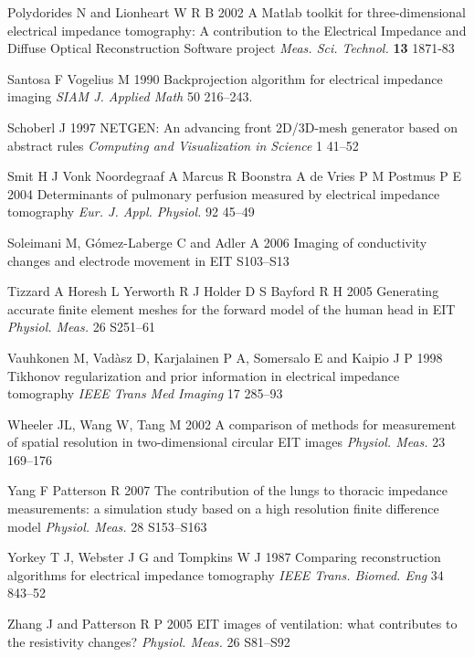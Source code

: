 \documentclass[12pt]{iopart}
\begin{document}
\item[]
Polydorides N and Lionheart W R B 2002 A Matlab toolkit for
three-dimensional electrical impedance tomography: A contribution
to the Electrical Impedance and Diffuse Optical Reconstruction
Software project {\em Meas. Sci. Technol.} {\bf 13} 1871-83

\item[]
Santosa F Vogelius M 1990
Backprojection algorithm for electrical impedance imaging
{\em SIAM J. Applied Math}
50 216--243. 

\item[]
Schoberl J 1997
NETGEN: An advancing front 2D/3D-mesh generator based on abstract rules
{\em Computing and Visualization in Science}
1 41--52 

\item[]
Smit H J
Vonk Noordegraaf A
Marcus R
Boonstra A
de Vries P M 
Postmus P E
2004
Determinants of pulmonary perfusion measured by electrical impedance tomography
{\em Eur. J. Appl. Physiol.}
92 45--49

\item[]
Soleimani M, G\'omez-Laberge C and Adler A 2006 Imaging of
conductivity changes and electrode movement in EIT 
S103--S13

\item[]
Tizzard A Horesh L Yerworth R J Holder D S Bayford R H 2005
Generating accurate finite element meshes for the forward
model of the human head in EIT
{\em Physiol. Meas.}
 26 S251--61 

\item[]
Vauhkonen M, Vad\`asz D, Karjalainen P A, Somersalo E and
Kaipio J P 1998
 Tikhonov regularization and prior information in
electrical impedance tomography
 {\em IEEE Trans Med Imaging}
17 285--93

\item[]
Wheeler JL, Wang W, Tang M 2002
A comparison of methods for measurement of spatial resolution in two-dimensional circular EIT images
{\em Physiol. Meas.}
23 169--176

\item[]
Yang F  Patterson R 2007
The contribution of the lungs to thoracic impedance
measurements: a simulation study based on a high
resolution finite difference model
{\em Physiol. Meas.}
28 S153--S163

\item[]
Yorkey T J, Webster J G and Tompkins W J 1987
Comparing reconstruction algorithms for electrical
impedance tomography
{\em IEEE Trans. Biomed. Eng}
34 843--52


\item[]
Zhang J and Patterson R P 2005 EIT images of ventilation: what
contributes to the resistivity changes?
{\em Physiol. Meas.}
 26 S81--S92

\endrefs
\end{document}
